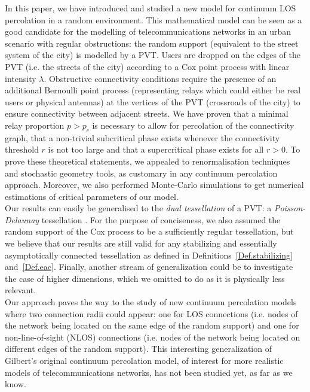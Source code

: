 \documentclass[10pt,a4paper]{amsart}
\theoremstyle{exampstyle}
\theoremstyle{exampnotations}
\begin{document}
In this paper, we have introduced and studied a new model for continuum LOS percolation in a random environment. This mathematical model can be seen as a good candidate for the modelling of telecommunications networks in an urban scenario with regular obstructions: the random support (equivalent to the street system of the city) is modelled by a PVT. Users are dropped on the edges of the PVT (i.e. the streets of the city) according to a Cox point process with linear intensity $\lambda$. Obstructive connectivity conditions require the presence of an additional Bernoulli point process (representing relays which could either be real users or physical antennas) at the vertices of the PVT (crossroads of the city) to ensure connectivity between adjacent streets. We have proven that a minimal relay proportion $p > p_c$ is necessary to allow for percolation of the connectivity graph, that a non-trivial subcritical phase exists whenever the connectivity threshold $r$ is not too large and that a supercritical phase exists for all $r>0$. To prove these theoretical statements, we appealed to renormalisation techniques and stochastic geometry tools, as customary in any continuum percolation approach. Moreover, we also performed Monte-Carlo simulations to get numerical estimations of critical parameters of our model. \\
\indent Our results can easily be generalised to the \emph{dual tessellation} of a PVT: a \emph{Poisson-Delaunay} tessellation \cite[Section 9.2]{chiu_stochastic_2013}. %
For the purpose of conciseness, we also assumed the random support of the Cox process to be a sufficiently regular tessellation, but we believe that our results are still valid for any stabilizing and essentially asymptotically connected tessellation as defined in Definitions~\ref{Def.stabilizing} and~\ref{Def.eac}. Finally, another stream of generalization could be to investigate the case of higher dimensions, which we omitted to do as it is physically less relevant. \\
\indent Our approach paves the way to the study of new continuum percolation models where two connection radii could appear: one for LOS connections (i.e. nodes of the network being located on the same edge of the random support) and one for non-line-of-sight (NLOS) connections (i.e. nodes of the network being located on different edges of the random support). This interesting generalization of Gilbert's original continuum percolation model, of interest for more realistic models of telecommunications networks, has not been studied yet, as far as we know.


\end{document}
